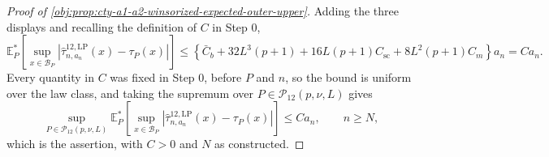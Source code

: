 \begin{proof}[Proof of \cref{obj:prop:cty-a1-a2-winsorized-expected-outer-upper}]
Adding the three displays and recalling the definition of \(C\) in Step 0,
\[
\mathbb E_P^*\!\left[\sup_{x\in\mathcal B_P}\left|\widehat\tau^{12,\mathrm{LP}}_{n,a_n}(x)-\tau_P(x)\right|\right]
\leq
\left\{\bar C_b+32L^3(p+1)+16L(p+1)C_{\mathrm{sc}}+8L^2(p+1)C_m\right\}a_n
=
Ca_n .
\]
Every quantity in \(C\) was fixed in Step 0, before \(P\) and \(n\), so the bound is uniform over the law class, and taking the supremum over \(P\in\mathcal P_{12}(p,\nu,L)\) gives
\[
\sup_{P\in\mathcal P_{12}(p,\nu,L)}
\mathbb E_P^*\!\left[
\sup_{x\in\mathcal B_P}
\left|\widehat\tau^{12,\mathrm{LP}}_{n,a_n}(x)-\tau_P(x)\right|
\right]
\leq
Ca_n,
\qquad n\geq N ,
\]
which is the assertion, with \(C>0\) and \(N\) as constructed.
\end{proof}

